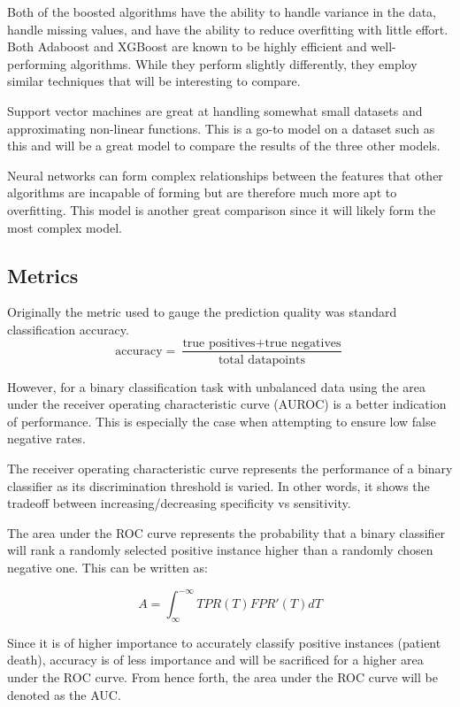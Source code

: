 \documentclass[11pt]{article}
\begin{document}
	Both of the boosted algorithms have the ability to handle variance in the data, handle missing values, and have the ability to reduce overfitting with little effort. Both Adaboost and XGBoost are known to be highly efficient and well-performing algorithms. While they perform slightly differently, they employ similar techniques that will be interesting to compare.
	
	Support vector machines are great at handling somewhat small datasets and approximating non-linear functions. This is a go-to model on a dataset such as this and will be a great model to compare the results of the three other models.
	
	Neural networks can form complex relationships between the features that other algorithms are incapable of forming but are therefore much more apt to overfitting. This model is another great comparison since it will likely form the most complex model.
	
	\subsection{Metrics}
	Originally the metric used to gauge the prediction quality was standard classification accuracy.
	\[ \text{accuracy} = \frac{\text{true positives} + \text{true negatives}} {\text{total datapoints}} \]
	
	However, for a binary classification task with unbalanced data using the area under the receiver operating characteristic curve (AUROC) is a better indication of performance. This is especially the case when attempting to ensure low false negative rates.
	
	The receiver operating characteristic curve represents the performance of a binary classifier as its discrimination threshold is varied. In other words, it shows the tradeoff between increasing/decreasing specificity vs sensitivity. 
	
	The area under the ROC curve represents the probability that a binary classifier will rank a randomly selected positive instance higher than a randomly chosen negative one. This can be written as:
	
	\[ A = \int_\infty^{-\infty} TPR(T)FPR'(T)dT\] 
	
	Since it is of higher importance to accurately classify positive instances (patient death), accuracy is of less importance and will be sacrificed for a higher area under the ROC curve. From hence forth, the area under the ROC curve will be denoted as the AUC.
	
\end{document}
